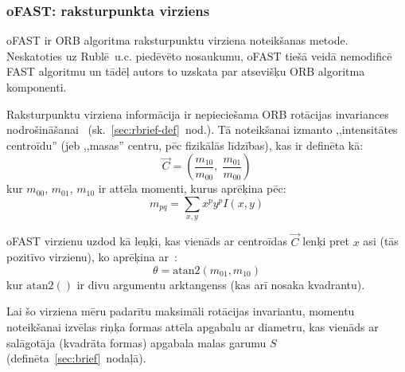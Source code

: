 \subsubsection{oFAST: raksturpunkta virziens} \label{sec:ofast}
oFAST ir ORB algoritma raksturpunktu virziena noteikšanas metode.
Neskatoties uz Rublē~u.c.\cite{ORB} piedēvēto nosaukumu, oFAST tiešā veidā
nemodificē FAST algoritmu un tādēļ autors to uzskata par atsevišķu ORB
algoritma komponenti.

Raksturpunktu virziena informācija ir nepieciešama
ORB rotācijas invariances nodrošināšanai~\cite{ORB}
(sk.~\ref{sec:rbrief-def}~nod.).
Tā noteikšanai izmanto
,,intensitātes centroīdu''\cite{Rosin}\cite{ORB} (jeb ,,masas'' centru, pēc fizikālās
līdzības), kas ir definēta kā:
\begin{equation}
	\vec{C} = \left( \frac{m_{10}}{m_{00}},\; \frac{m_{01}}{m_{00}} \right)
\end{equation}
kur $m_{00}$, $m_{01}$, $m_{10}$ ir attēla momenti, kurus aprēķina pēc:
\begin{equation}
	m_{pq} = \sum_{x,y} x^p y^p I(x,y)
\end{equation}

oFAST virzienu uzdod kā leņķi, kas vienāds ar centroīdas $\vec{C}$
lenķi pret $x$ asi (tās pozitīvo virzienu), ko aprēķina ar~\cite{ORB}:
\begin{equation}
	\theta = \mathrm{atan2}(m_{01}, m_{10})
\end{equation}
kur $\mathrm{atan2}()$ ir divu argumentu arktangenss (kas arī nosaka kvadrantu).

Lai šo virziena mēru padarītu maksimāli rotācijas invariantu,
momentu noteikšanai izvēlas riņķa formas attēla apgabalu ar diametru, kas
vienāds ar salāgotāja (kvadrāta formas) apgabala malas garumu $S$~\cite{ORB}
(definēta~\ref{sec:brief}~nodaļā).

